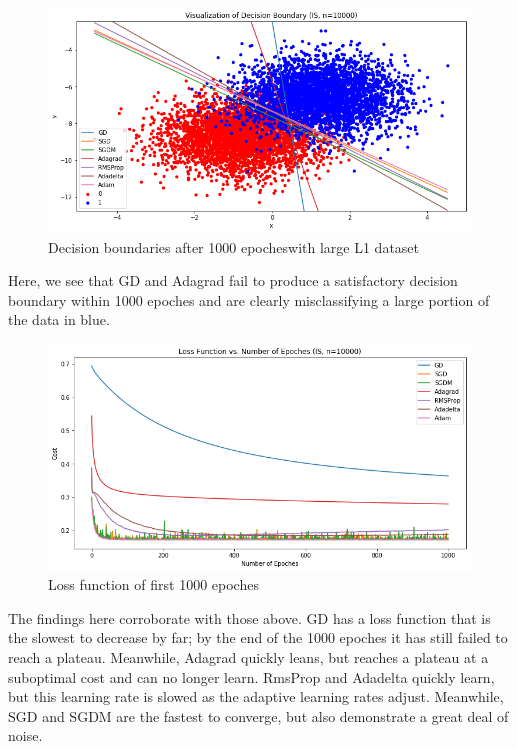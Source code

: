 \documentclass[twoside,11pt]{homework}
\begin{document}
\begin{figure}[H]
		\centering
		\includegraphics[scale=.5]{q5/insep_10000/lines.png}
		\caption{Decision boundaries after 1000 epocheswith large L1 dataset}
	\end{figure}

Here, we see that GD and Adagrad fail to produce a satisfactory decision boundary within 1000 epoches and are clearly misclassifying a large portion of the data in blue.

	\begin{figure}[H]
		\centering
		\includegraphics[scale=.5]{q5/insep_10000/loss_n1000.png}
		\caption{Loss function of first 1000 epoches}
	\end{figure}
The findings here corroborate with those above. GD has a loss function that is the slowest to decrease by far; by the end of the 1000 epoches it has still failed to reach a plateau. Meanwhile, Adagrad quickly leans, but reaches a plateau at a suboptimal cost and can no longer learn. RmsProp and Adadelta quickly learn, but this learning rate is slowed as the adaptive learning rates adjust. Meanwhile, SGD and SGDM are the fastest to converge, but also demonstrate a great deal of noise.
\end{document}
